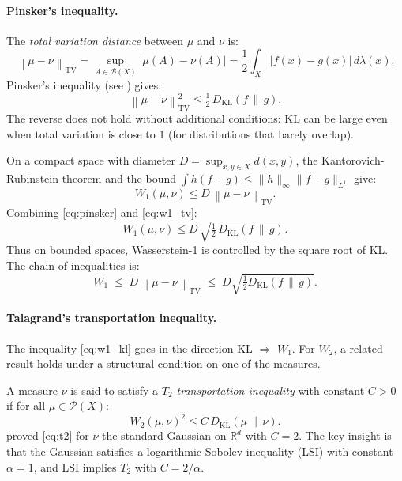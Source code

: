 \documentclass[12pt]{article}
\newcommand{\KL}[2]{D_{\mathrm{KL}}\!\left(#1\,\|\,#2\right)}
\newcommand{\TV}[2]{\left\|#1 - #2\right\|_{\mathrm{TV}}}
\newcommand{\calP}{\mathcal{P}}
\newcommand{\R}{\mathbb{R}}
\begin{document}
\paragraph{Pinsker's inequality.}

The \emph{total variation distance} between $\mu$ and $\nu$ is:
\begin{equation}\label{eq:tv}
  \TV{\mu}{\nu} = \sup_{A \in \mathcal{B}(X)} |\mu(A) - \nu(A)|
  = \frac{1}{2}\int_X |f(x) - g(x)|\,d\lambda(x).
\end{equation}
Pinsker's inequality (see \citealt{CoverThomas2006}) gives:
\begin{equation}\label{eq:pinsker}
  \boxed{\TV{\mu}{\nu}^2 \leq \tfrac{1}{2}\,\KL{f}{g}.}
\end{equation}
The reverse does not hold without additional conditions: KL can
be large even when total variation is close to 1 (for distributions
that barely overlap).

On a compact space with diameter $D = \sup_{x,y\in X}d(x,y)$,
the Kantorovich-Rubinstein theorem and the bound
$\int h(f-g) \leq \|h\|_\infty\|f-g\|_{L^1}$ give:
\begin{equation}\label{eq:w1_tv}
  W_1(\mu,\nu) \leq D\,\TV{\mu}{\nu}.
\end{equation}
Combining \eqref{eq:pinsker} and \eqref{eq:w1_tv}:
\begin{equation}\label{eq:w1_kl}
  W_1(\mu,\nu) \leq D\,\sqrt{\tfrac{1}{2}\,\KL{f}{g}}.
\end{equation}
Thus on bounded spaces, Wasserstein-1 is controlled by the square
root of KL.  The chain of inequalities is:
\[
  W_1 \;\leq\; D\,\TV{\mu}{\nu} \;\leq\; D\sqrt{\tfrac{1}{2}\KL{f}{g}}.
\]

\paragraph{Talagrand's transportation inequality.}

The inequality \eqref{eq:w1_kl} goes in the direction
KL $\Rightarrow$ $W_1$.  For $W_2$, a related result holds
under a structural condition on one of the measures.

A measure $\nu$ is said to satisfy a \emph{$T_2$ transportation
inequality} with constant $C > 0$ if for all $\mu \in \calP(X)$:
\begin{equation}\label{eq:t2}
  W_2(\mu,\nu)^2 \leq C\,\KL{\mu}{\nu}.
\end{equation}
\citet{Talagrand1996} proved \eqref{eq:t2} for $\nu$ the
standard Gaussian on $\R^d$ with $C = 2$.  The key insight is
that the Gaussian satisfies a logarithmic Sobolev inequality
(LSI) with constant $\alpha = 1$, and LSI implies $T_2$ with
$C = 2/\alpha$.
\end{document}
